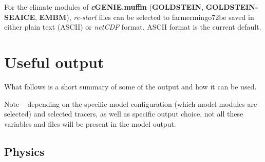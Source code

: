 \documentclass[11pt,fleqn]{book} %
\begin{document}
For the climate modules of \textbf{\textit{c}GENIE.muffin} (\textbf{GOLDSTEIN}, \textbf{GOLDSTEIN-SEAICE}, \textbf{EMBM}), \textit{re-start} files can be selected to farmermingo72be saved in either plain text (ASCII) or \textit{netCDF} format. ASCII format is the current default. 


\newpage


\section{Useful output}

What follows is a short summary of some of the output and how it can be used.

Note -- depending on the specific model configuration (which model modules are selected) and selected tracers, as well as specific output choice, not all these variables and files will be present in the model output.


\subsection{Physics}
\end{document}
